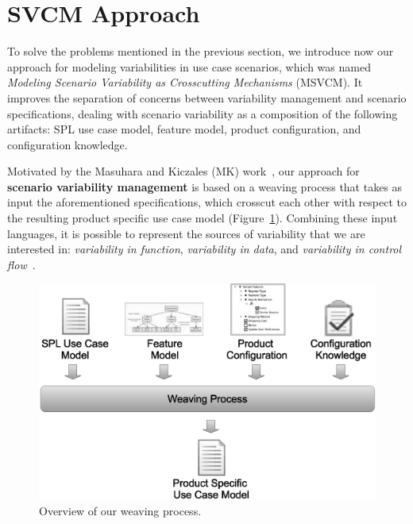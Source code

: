 \section{SVCM Approach}
\label{sec:svmc}

To solve the problems mentioned in the previous section, we introduce now our
approach for modeling variabilities in use case scenarios, which was named
\emph{Modeling Scenario Variability as Crosscutting Mechanisms} (MSVCM). It
improves the separation of concerns between variability management and scenario
specifications, dealing with scenario variability as a composition of the
following artifacts: SPL use case model, feature model, product configuration,
and configuration knowledge.

Motivated by the Masuhara and Kiczales (MK) work~\cite{Masuhara:2003aa}, our
approach for \textbf{scenario variability management} is based on a weaving
process that takes as input the aforementioned specifications, which crosscut
each other with respect to the resulting product specific use case model
(Figure~\ref{fig:weave-process}). Combining these input languages, it is possible
to represent the sources of variability that we are interested in:
\emph{variability in function}, \emph{variability in data}, and \emph{variability in
control flow}~\cite{Bachmann:2001aa}.

\begin{figure}[htb]
 \begin{center}
  \includegraphics[scale=0.30]{img/weave-process2.eps}
  \caption{Overview of our weaving process.}
  \label{fig:weave-process}
  \end{center}
\end{figure}

